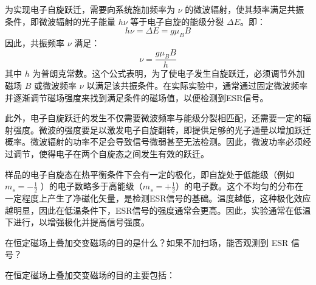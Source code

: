 \documentclass[dvipsnames, svgnames,a4paper,11pt]{article}
\begin{document}
为实现电子自旋跃迁，需要向系统施加频率为 \( \nu \) 的微波辐射，使其频率满足共振条件，即微波辐射的光子能量 \( h \nu \) 等于电子自旋的能级分裂 \( \Delta E \)。即：\[ h \nu = \Delta E = g \mu_B B \]因此，共振频率 \( \nu \) 满足：\[ \nu = \frac{g \mu_B B}{h} \]其中 \( h \) 为普朗克常数。这个公式表明，为了使电子发生自旋跃迁，必须调节外加磁场 \( B \) 或微波频率 \( \nu \) 以满足该共振条件。在实际实验中，通常通过固定微波频率并逐渐调节磁场强度来找到满足条件的磁场值，以便检测到ESR信号。

此外，电子自旋跃迁的发生不仅需要微波频率与能级分裂相匹配，还需要一定的辐射强度。微波的强度要足以激发电子自旋翻转，即提供足够的光子通量以增加跃迁概率。微波辐射的功率不足会导致信号微弱甚至无法检测。因此，微波功率必须经过调节，使得电子在两个自旋态之间发生有效的跃迁。

样品的电子自旋态在热平衡条件下会有一定的极化，即自旋处于低能级（例如 \( m_s = -\frac{1}{2} \) ）的电子数略多于高能级（\( m_s = +\frac{1}{2} \)）的电子数。这个不均匀的分布在一定程度上产生了净磁化矢量，是检测ESR信号的基础。温度越低，这种极化效应越明显，因此在低温条件下，ESR信号的强度通常会更高。因此，实验通常在低温下进行，以增强极化并提高信号强度。

	




\begin{question}
	在恒定磁场上叠加交变磁场的目的是什么？如果不加扫场，能否观测到 ESR 信号？
\end{question}

在恒定磁场上叠加交变磁场的目的主要包括：


		
		
\end{document}

